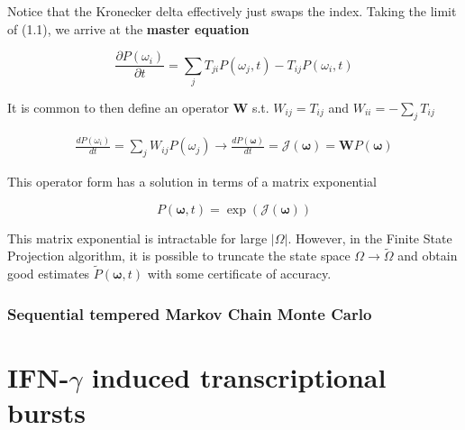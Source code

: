 \documentclass{ucetd}
\begin{document}
Notice that the Kronecker delta effectively just swaps the index. Taking the limit of (1.1), we arrive at the \textbf{master equation}


\begin{equation*}
\frac{\partial P(\omega_{i})}{\partial t} = \sum_{j}T_{ji}P(\omega_{j},t) - T_{ij}P(\omega_{i},t)
\end{equation*}

It is common to then define an operator $\bm{W}$ s.t. $W_{ij} = T_{ij}$ and $W_{ii} = -\sum_{j}T_{ij}$ 

\begin{align*}
\frac{dP(\omega_{i})}{dt} = \sum_{j}W_{ij}P(\omega_{j}) \rightarrow \frac{dP(\bm{\omega})}{dt} = \mathcal{J}(\bm{\omega}) = \mathbf{W}P(\bm{\omega})
\end{align*}

This operator form has a solution in terms of a matrix exponential

\begin{equation*}
P(\bm{\omega}, t) = \exp(\mathcal{J}(\bm{\omega}))
\end{equation*}

This matrix exponential is intractable for large $|\Omega|$. However, in the Finite State Projection algorithm, it is possible to truncate the state space $\Omega \rightarrow \tilde{\Omega}$ and obtain good estimates $\tilde{P}(\bm{\omega}, t)$ with some certificate of accuracy.

\subsection{Sequential tempered Markov Chain Monte Carlo}


\chapter{IFN-$\gamma$ induced transcriptional bursts}
\end{document}
